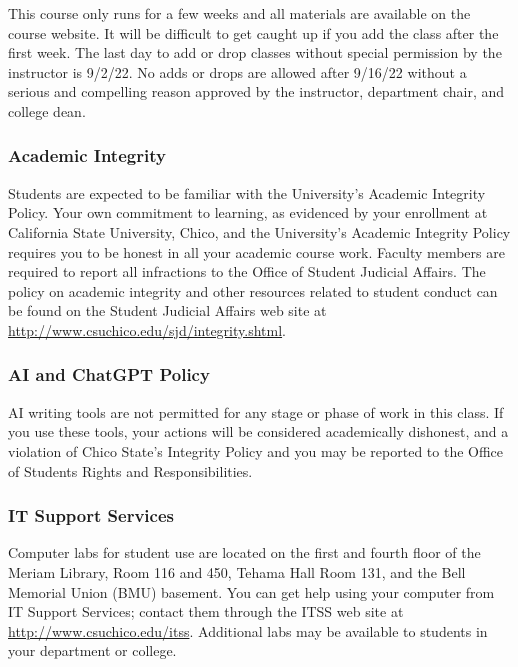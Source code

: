 \documentclass[
  11pt,
]{article}
\begin{document}
This course only runs for a few weeks and all materials are available on
the course website. It will be difficult to get caught up if you add the
class after the first week. The last day to add or drop classes without
special permission by the instructor is 9/2/22. No adds or drops are
allowed after 9/16/22 without a serious and compelling reason approved
by the instructor, department chair, and college dean.

\hypertarget{academic-integrity}{%
\subsubsection{Academic Integrity}\label{academic-integrity}}

Students are expected to be familiar with the University's Academic
Integrity Policy. Your own commitment to learning, as evidenced by your
enrollment at California State University, Chico, and the University's
Academic Integrity Policy requires you to be honest in all your academic
course work. Faculty members are required to report all infractions to
the Office of Student Judicial Affairs. The policy on academic integrity
and other resources related to student conduct can be found on the
Student Judicial Affairs web site at
\url{http://www.csuchico.edu/sjd/integrity.shtml}.

\hypertarget{ai-and-chatgpt-policy}{%
\subsubsection{AI and ChatGPT Policy}\label{ai-and-chatgpt-policy}}

AI writing tools are not permitted for any stage or phase of work in this class. If you use these tools, your actions will be considered academically dishonest, and a violation of Chico State's Integrity Policy and you may be reported to the Office of Students Rights and Responsibilities. 


\hypertarget{it-support-services}{%
\subsubsection{IT Support Services}\label{it-support-services}}

Computer labs for student use are located on the first and fourth floor
of the Meriam Library, Room 116 and 450, Tehama Hall Room 131, and the
Bell Memorial Union (BMU) basement. You can get help using your computer
from IT Support Services; contact them through the ITSS web site at
\url{http://www.csuchico.edu/itss}. Additional labs may be available to
students in your department or college.
\end{document}
